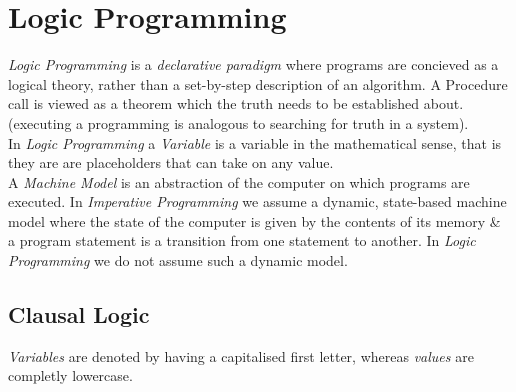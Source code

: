 \documentclass[11pt,a4paper]{article}
\begin{document}
\section{Logic Programming}

\textit{Logic Programming} is a \textit{declarative paradigm} where programs are concieved as a logical theory, rather than a set-by-step description of an algorithm. A Procedure call is viewed as a theorem which the truth needs to be established about. (\ie executing a programming is analogous to searching for truth in a system).\\

In \textit{Logic Programming} a \textit{Variable} is a variable in the mathematical sense, that is they are are placeholders that can take on any value.\\

A \textit{Machine Model} is an abstraction of the computer on which programs are executed. In \textit{Imperative Programming} we assume a dynamic, state-based machine model where the state of the computer is given by the contents of its memory \& a program statement is a transition from one statement to another. In \textit{Logic Programming} we do not assume such a dynamic model.

\subsection{Clausal Logic}

\textit{Variables} are denoted by having a capitalised first letter, whereas \textit{values} are completly lowercase.\\
\end{document}

